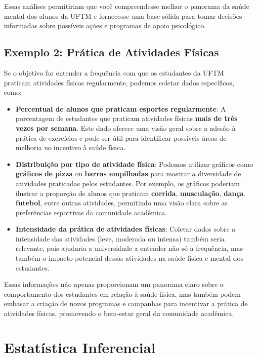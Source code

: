 \documentclass[
]{book}
\begin{document}
Essas análises permitiriam que você compreendesse melhor o panorama da saúde mental dos alunos da UFTM e fornecesse uma base sólida para tomar decisões informadas sobre possíveis ações e programas de apoio psicológico.

\subsection{\texorpdfstring{Exemplo 2: \textbf{Prática de Atividades Físicas}}{Exemplo 2: Prática de Atividades Físicas}}\label{exemplo-2-pruxe1tica-de-atividades-fuxedsicas}

Se o objetivo for entender a frequência com que os estudantes da UFTM praticam atividades físicas regularmente, podemos coletar dados específicos, como:

\begin{itemize}
\item
  \textbf{Percentual de alunos que praticam esportes regularmente}: A porcentagem de estudantes que praticam atividades físicas \textbf{mais de três vezes por semana}. Este dado oferece uma visão geral sobre a adesão à prática de exercícios e pode ser útil para identificar possíveis áreas de melhoria no incentivo à saúde física.
\item
  \textbf{Distribuição por tipo de atividade física}: Podemos utilizar gráficos como \textbf{gráficos de pizza} ou \textbf{barras empilhadas} para mostrar a diversidade de atividades praticadas pelos estudantes. Por exemplo, os gráficos poderiam ilustrar a proporção de alunos que praticam \textbf{corrida}, \textbf{musculação}, \textbf{dança}, \textbf{futebol}, entre outras atividades, permitindo uma visão clara sobre as preferências esportivas da comunidade acadêmica.
\item
  \textbf{Intensidade da prática de atividades físicas}: Coletar dados sobre a intensidade das atividades (leve, moderada ou intensa) também seria relevante, pois ajudaria a universidade a entender não só a frequência, mas também o impacto potencial dessas atividades na saúde física e mental dos estudantes.
\end{itemize}

Essas informações não apenas proporcionam um panorama claro sobre o comportamento dos estudantes em relação à saúde física, mas também podem embasar a criação de novos programas e campanhas para incentivar a prática de atividades físicas, promovendo o bem-estar geral da comunidade acadêmica.

\section{Estatística Inferencial}\label{estatuxedstica-inferencial}
\end{document}
